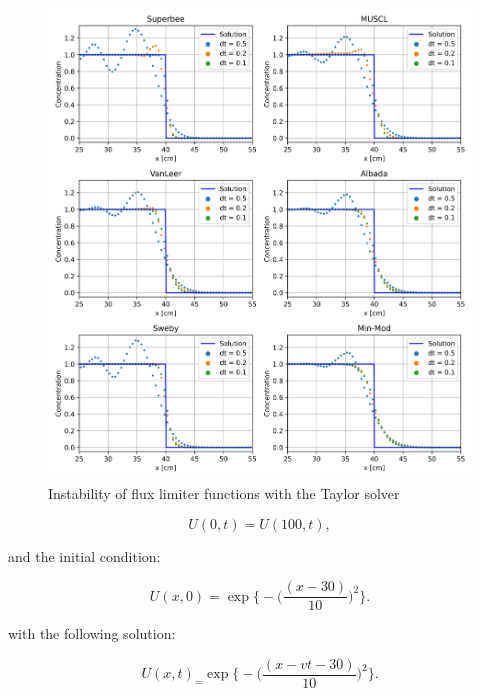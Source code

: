\begin{figure}[p]
    \centering
    \includegraphics[width=6in]{images/chapter-5/progressionProblems/problem3/problem3SecondOrderFluxLimiterFunctionInstability.png}
    \caption{Instability of flux limiter functions with the Taylor solver}
    \label{fig:fluxlimiters_instability_problem3}
\end{figure}

\clearpage

\begin{equation}
    U(0,t) = U(100, t),
\end{equation}

\noindent and the initial condition:

\begin{equation}
    U(x,0) = \exp\bigg\{-\bigg(\frac{(x-30)}{10}\bigg)^{2}\bigg\}.
\end{equation}

\noindent with the following solution:

\begin{equation}
	U(x,t)_ = \exp\bigg\{-\bigg(\frac{(x-vt-30)}{10}\bigg)^{2}\bigg\}.
\end{equation}

